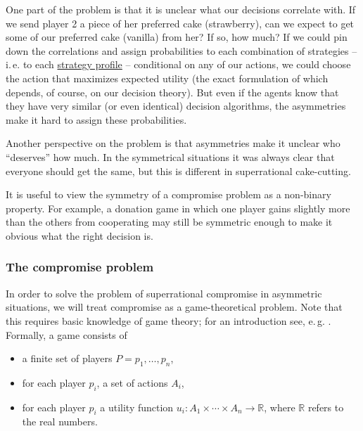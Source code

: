 One part of the problem is that it is unclear what our decisions
correlate with. If we send player 2 a piece of her preferred cake
(strawberry), can we expect to get some of our preferred cake (vanilla)
from her? If so, how much? If we could pin down the correlations and
assign probabilities to each combination of strategies -- i.\,e. to each
\href{https://en.wikipedia.org/wiki/Strategy_(game_theory)}{strategy
profile} -- conditional on any of our actions, we could choose the
action that maximizes expected utility (the exact formulation of which
depends, of course, on our decision theory). But even if the agents know
that they have very similar (or even identical) decision algorithms, the
asymmetries make it hard to assign these probabilities.

Another perspective on the problem is that asymmetries make it unclear
who ``deserves'' how much. In the symmetrical situations it was always
clear that everyone should get the same, but this is different in
superrational cake-cutting.

It is useful to view the symmetry of a compromise problem as a
non-binary property. For example, a donation game in which one player
gains slightly more than the others from cooperating may still be
symmetric enough to make it obvious what the right decision is.

\hypertarget{the-compromise-problem}{\subsubsection{The compromise
problem}\label{the-compromise-problem}}

In order to solve the problem of superrational compromise in asymmetric
situations, we will treat compromise as a game-theoretical problem. Note
that this requires basic knowledge of game theory; for an introduction
see, e.\,g. \citet{Osborne2004-ui}. Formally, a game
consists of

\begin{itemize}
\item
  a finite set of players \(P = { p_{1},\dotsc,p_{n}}\),
\item
  for each player \(p_{i}\), a set of actions \(A_{i}\),
\item
  for each player \(p_{i}\) a utility function
  \(u_{i}\colon A_{1} \times \dotsm \times A_{n} \rightarrow \mathbb{R}\), where
  \(\mathbb{R}\) refers to the real numbers. 
\end{itemize}


